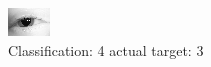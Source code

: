 \begin{figure}[h!]
\begin{center}
\includegraphics[width=0.60\columnwidth]{figures/ID133_class_4_target_3.png}
\end{center}
\caption{ Classification: 4 actual target: 3}
\label{fig:ID133_class_4_target_3}
\end{figure}
